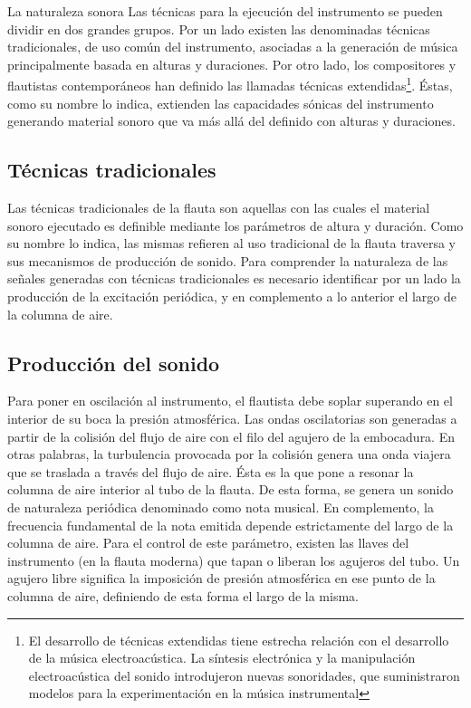 \documentclass
  [ams,pdfout]%
	{aeslac}
\begin{document}
La naturaleza sonora 
Las técnicas para la ejecución del instrumento se pueden dividir en dos grandes grupos. Por un lado existen las denominadas técnicas tradicionales, de uso común del instrumento, asociadas a la generación de música principalmente basada en alturas y duraciones. Por otro lado, los compositores y flautistas contemporáneos han definido las llamadas técnicas extendidas\footnote{El desarrollo de técnicas extendidas tiene estrecha relación con el desarrollo de la música electroacústica. La síntesis electrónica y la manipulación electroacústica del sonido introdujeron nuevas sonoridades, que suministraron modelos para la experimentación en la música instrumental}. Éstas, como su nombre lo indica, extienden las capacidades sónicas del instrumento generando material sonoro que va más allá del definido con alturas y duraciones.

%
\subsection{Técnicas tradicionales}

Las técnicas tradicionales de la flauta son aquellas con las cuales el material sonoro ejecutado es definible mediante los parámetros de altura y duración. Como su nombre lo indica, las mismas refieren al uso tradicional de la flauta traversa y sus mecanismos de producción de sonido. Para comprender la naturaleza de las señales generadas con técnicas tradicionales es necesario identificar por un lado la producción de la excitación periódica, y en complemento a lo anterior el largo de la columna de aire. 

%
\subsection*{Producción del sonido}

Para poner en oscilación al instrumento, el flautista debe soplar superando en el interior de su boca la presión atmosférica. Las ondas oscilatorias son generadas a partir de la colisión del flujo de aire con el filo del agujero de la embocadura. En otras palabras, la turbulencia provocada por la colisión genera una onda viajera que se traslada a través del flujo de aire. Ésta es la que pone a resonar la columna de aire interior al tubo de la flauta. De esta forma, se genera un sonido de naturaleza periódica denominado como nota musical. En complemento, la frecuencia fundamental de la nota emitida depende estrictamente del largo de la columna de aire. Para el control de este parámetro, existen las llaves del instrumento (en la flauta moderna) que tapan o liberan los agujeros del tubo. Un agujero libre significa la imposición de presión atmosférica en ese punto de la columna de aire, definiendo de esta forma el largo de la misma.
\end{document}
